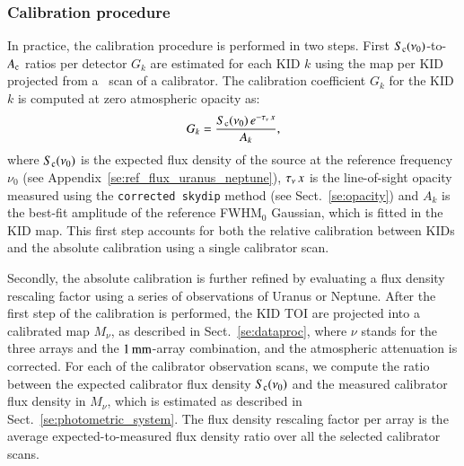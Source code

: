 \subsubsection{Calibration procedure}
\label{se:practical_calib}

{\lp In practice, the calibration procedure is performed in two steps. First
$S_{\rm{c}}(\nu_{0})$-to-$A_{\rm{c}}$ ratios per detector $G_k$
are estimated for each KID $k$ using the map per KID projected from
a \bm\ scan of a calibrator. The calibration coefficient $G_k$
for the KID $k$ is computed at zero atmospheric opacity as:
\begin{equation}
  G_k = \frac{S_{\rm{c}}(\nu_0)\, e^{-\taunu\,x}}{A_k},
  \label{eq:kid_gain}
\end{equation}
where $S_{\rm{c}}(\nu_0)$ is the expected flux density of the source at
the reference frequency $\nu_0$ (see
Appendix~\ref{se:ref_flux_uranus_neptune}), $\taunu\, x$ is the
line-of-sight opacity measured using the {\tt corrected skydip} method
(see Sect.~\ref{se:opacity}) and $A_k$ is the best-fit
amplitude of the reference FWHM$_0$ Gaussian, which is fitted in the
KID map. %
This first step accounts for both the relative calibration between KIDs and the absolute
calibration using a single calibrator scan.

Secondly, the absolute calibration is further refined by evaluating a
flux density rescaling factor using a series of observations of
Uranus or Neptune. After the first step of the calibration is
performed, the KID TOI are projected into a calibrated map $M_\nu$, as
described in Sect.~\ref{se:dataproc}, where $\nu$ stands for the three
arrays and the $1\,\rm{mm}$-array combination, and the atmospheric attenuation
is corrected. For each of the calibrator observation scans, we
compute the ratio between the expected calibrator flux density
$S_{\rm{c}}(\nu_{0})$ and the measured calibrator flux density in $M_\nu$, which
is estimated as described in Sect.~\ref{se:photometric_system}. The
flux density rescaling factor per array is the average
expected-to-measured flux density ratio over all the selected calibrator scans.} 

%

